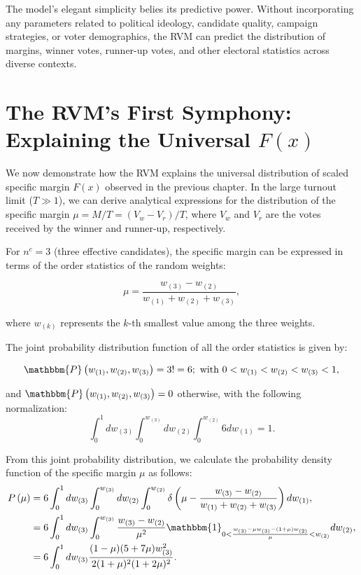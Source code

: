 The model's elegant simplicity belies its predictive power. Without incorporating any parameters related to political ideology, candidate quality, campaign strategies, or voter demographics, the RVM can predict the distribution of margins, winner votes, runner-up votes, and other electoral statistics across diverse contexts.

\section{The RVM's First Symphony: Explaining the Universal $F(x)$}

We now demonstrate how the RVM explains the universal distribution of scaled specific margin $F(x)$ observed in the previous chapter. In the large turnout limit ($T \gg 1$), we can derive analytical expressions for the distribution of the specific margin $\mu = M/T = (V_w - V_r)/T$, where $V_w$ and $V_r$ are the votes received by the winner and runner-up, respectively.

For $n^c = 3$ (three effective candidates), the specific margin can be expressed in terms of the order statistics of the random weights:

\begin{equation}
    \mu = \frac{w_{(3)} - w_{(2)}}{w_{(1)} + w_{(2)} + w_{(3)}},
\end{equation}

where $w_{(k)}$ represents the $k$-th smallest value among the three weights.

The joint probability distribution function of all the order statistics is given by:

\begin{align}
    \mathbbm{P}\left(w_{(1)}, w_{(2)}, w_{(3)}\right) = 3! = 6; \text{ with } 0<w_{(1)}<w_{(2)}<w_{(3)}<1,
\end{align}

and $\mathbbm{P}\left(w_{(1)}, w_{(2)}, w_{(3)}\right) = 0$ otherwise, with the following normalization:
\begin{equation}
    \int_{0}^{1}dw_{(3)}\int_{0}^{w_{(3)}}dw_{(2)}\int_{0}^{w_{(2)}} 6 dw_{(1)} = 1.
\end{equation}

From this joint probability distribution, we calculate the probability density function of the specific margin $\mu$ as follows:
\begin{align}
    \nonumber P\left(\mu\right) & = 6 \nonumber \int_{0}^{1}dw_{(3)}\int_{0}^{w_{(3)}}dw_{(2)}\int_{0}^{w_{(2)}} \delta\left(\mu - \frac{w_{(3)}- w_{(2)}}{w_{(1)} + w_{(2)} + w_{(3)}}\right)dw_{(1)},\\
    & = 6 \int_{0}^{1}dw_{(3)}\int_{0}^{w_{(3)}} \frac{w_{(3)} - w_{(2)}}{\mu^2} \nonumber \mathbbm{1}_{0<\frac{w_{(3)} - \mu w_{(3)} - (1 + \mu)w_{(2)}}{\mu}<w_{(2)}} dw_{(2)},\\
    & = 6 \int_{0}^{1}dw_{(3)} \frac{(1 - \mu)(5 + 7\mu)w_{(3)}^2}{2(1 + \mu)^2(1 + 2\mu)^2}.\\
\end{align}

